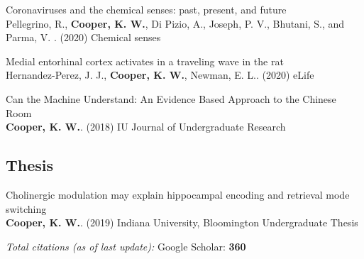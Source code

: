 \documentclass[10pt]{cooperCV2}
\begin{document}
\begin{etaremune}[resume,itemindent=-1.5\bibhang, topsep=0pt,
				   itemsep=\bibsep,partopsep=0pt,parsep=0pt,leftmargin={\bibhang+\widthof{[999]}}]
	
    \item Coronaviruses and the chemical senses: past, present, and future \\
     Pellegrino, R., \textbf{Cooper, K. W.}, Di Pizio, A., Joseph, P. V., Bhutani, S., and Parma, V. . (2020) Chemical senses 
     
	
    \item Medial entorhinal cortex activates in a traveling wave in the rat \\
     Hernandez-Perez, J. J., \textbf{Cooper, K. W.}, Newman, E. L.. (2020) eLife 
     
	
    \item Can the Machine Understand: An Evidence Based Approach to the Chinese Room \\
     \textbf{Cooper, K. W.}. (2018) IU Journal of Undergraduate Research 
     
	

\end{etaremune}

 

	

\subsection{Thesis} 
\begin{etaremune}[resume,itemindent=-1.5\bibhang, topsep=0pt,
				   itemsep=\bibsep,partopsep=0pt,parsep=0pt,leftmargin={\bibhang+\widthof{[999]}}] 
    
    \item Cholinergic modulation may explain hippocampal encoding and retrieval mode switching \\
     \textbf{Cooper, K. W.}. (2019) Indiana University, Bloomington Undergraduate Thesis 
     
	

\end{etaremune}



\vspace{0.5cm}
\textit{Total citations (as of last update):} \aiGoogleScholar \hspace{0.05cm} Google Scholar: \textbf{360}
\end{document}
